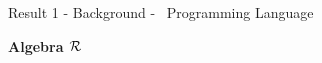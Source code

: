 \begin{frame}{Result 1 - Background - \WhileCC\ Programming Language}
\begin{minipage}[t]{0.33\linewidth}
\begin{itemize}
            \end{itemize}
    \end{minipage}
    \begin{minipage}[t]{0.34\linewidth}
         \pause 
         \begin{center}
            \vspace{0.2em}
             \textbf{\color{Blue}Algebra $\mathcal{R}$}
         \end{center}
         \begin{center}
        \end{center}
        

\end{minipage}
\end{frame}
